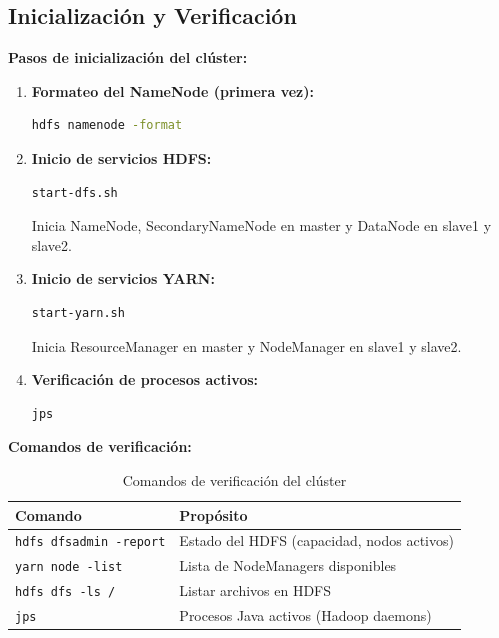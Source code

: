 \documentclass[12pt,a4paper]{article}
\begin{document}
\subsection{Inicialización y Verificación}

\textbf{Pasos de inicialización del clúster:}

\begin{enumerate}
    \item \textbf{Formateo del NameNode (primera vez):}
    \begin{lstlisting}[language=bash, basicstyle=\small\ttfamily]
hdfs namenode -format
    \end{lstlisting}
    
    \item \textbf{Inicio de servicios HDFS:}
    \begin{lstlisting}[language=bash, basicstyle=\small\ttfamily]
start-dfs.sh
    \end{lstlisting}
    Inicia NameNode, SecondaryNameNode en master y DataNode en slave1 y slave2.
    
    \item \textbf{Inicio de servicios YARN:}
    \begin{lstlisting}[language=bash, basicstyle=\small\ttfamily]
start-yarn.sh
    \end{lstlisting}
    Inicia ResourceManager en master y NodeManager en slave1 y slave2.
    
    \item \textbf{Verificación de procesos activos:}
    \begin{lstlisting}[language=bash, basicstyle=\small\ttfamily]
jps
    \end{lstlisting}
\end{enumerate}

\textbf{Comandos de verificación:}

\begin{table}[H]
\centering
\small
\begin{tabular}{ll}
\toprule
\textbf{Comando} & \textbf{Propósito} \\
\midrule
\texttt{hdfs dfsadmin -report} & Estado del HDFS (capacidad, nodos activos) \\
\texttt{yarn node -list} & Lista de NodeManagers disponibles \\
\texttt{hdfs dfs -ls /} & Listar archivos en HDFS \\
\texttt{jps} & Procesos Java activos (Hadoop daemons) \\
\bottomrule
\end{tabular}
\caption{Comandos de verificación del clúster}
\label{tab:comandos_verificacion}
\end{table}
\end{document}
